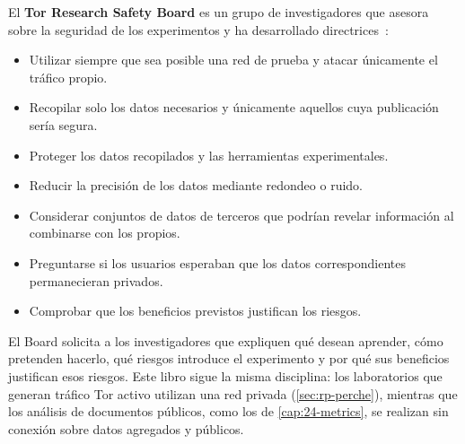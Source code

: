 El \textbf{Tor Research Safety Board} es un grupo de investigadores que asesora sobre la seguridad de los experimentos y ha desarrollado directrices~\cite{trsb}:
\begin{itemize}
  \item Utilizar siempre que sea posible una red de prueba y atacar únicamente el tráfico propio.
  \item Recopilar solo los datos necesarios y únicamente aquellos cuya publicación sería segura.
  \item Proteger los datos recopilados y las herramientas experimentales.
  \item Reducir la precisión de los datos mediante redondeo o ruido.
  \item Considerar conjuntos de datos de terceros que podrían revelar información al combinarse con los propios.
  \item Preguntarse si los usuarios esperaban que los datos correspondientes permanecieran privados.
  \item Comprobar que los beneficios previstos justifican los riesgos.
\end{itemize}

El Board solicita a los investigadores que expliquen qué desean aprender, cómo pretenden hacerlo, qué riesgos introduce el experimento y por qué sus beneficios justifican esos riesgos. Este libro sigue la misma disciplina: los laboratorios que generan tráfico Tor activo utilizan una red privada (\cref{sec:rp-perche}), mientras que los análisis de documentos públicos, como los de \cref{cap:24-metrics}, se realizan sin conexión sobre datos agregados y públicos.

